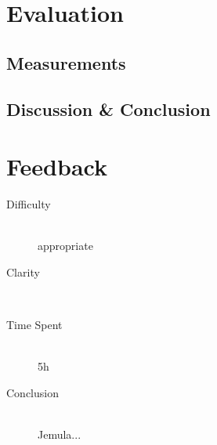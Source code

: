 \documentclass[12pt]{article}
\begin{document}
\section{Evaluation}

\subsection{Measurements}

\subsection{Discussion & Conclusion}


\section{Feedback}

\begin{description}
  \item[Difficulty] \hfill \\ appropriate
  \item[Clarity] \hfill \\ 
  \item[Time Spent] \hfill \\ 5h
  \item[Conclusion] \hfill \\ Jemula...
\end{description}
\end{document}
